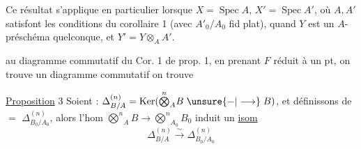 Ce résultat s'applique en particulier lorsque $X=\operatorname{Spec}A$, $X'=\operatorname{Spec}A'$, où $A,A'$ satisfont les conditions du corollaire 1 (avec $A'_0/A_0$ fid plat), quand $Y$ est un $A$-préschéma quelconque, et $Y'=Y\otimes_A A'$.


  au diagramme commutatif du Cor. 1 de prop. 1, en  prenant $F$ réduit à un pt, on trouve un diagramme commutatif
on trouve  

\uline{Proposition} 3 \quad {} Soient : $\Delta_{B/A}^{(n)}=\operatorname{Ker}(\overset n{\bigotimes}_A B\mathrel{\unsure{-|\longrightarrow}} B)$,  et définissons de $=$ $\Delta_{B_0/A_0}^{(n)}$, alors l'hom $\overset n{\bigotimes}_A B\longrightarrow\overset n{\bigotimes}_{A_0}B_0$ induit un \uline{isom}
\[
\Delta_{B/A}^{(n)}\xrightarrow{\sim}\Delta_{B_0/A_0}^{(n)}
\]
